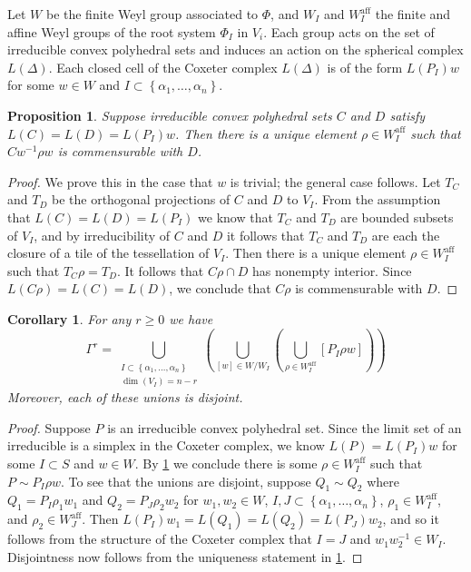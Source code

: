 \documentclass[11pt]{amsart}
\newtheorem{prop}[theorem]{Proposition}
\newtheorem{corollary}[theorem]{Corollary}
\numberwithin{table}{section}
\numberwithin{figure}{section}
\theoremstyle{remark}
\providecommand{\set}[1]{\left\lbrace#1\right\rbrace}
\newcommand{\Waff}[1][]{\ensuremath{W^{\mathrm{aff}}_{#1}}}
\begin{document}
Let $W$ be the finite Weyl group associated to $\Phi$, and $W_I$ and
$\Waff[I]$ the finite and affine Weyl groups of the root system
$\Phi_I$ in $V_i$. Each group acts on the set of irreducible convex
polyhedral sets and induces an action on the spherical complex
$L(\Delta)$. Each closed cell of the Coxeter complex $L(\Delta)$ is of
the form $L(P_I) w$ for some $w\in W$ and
$I\subset \set{\alpha_1,\dotsc, \alpha_n}$.

\begin{prop} \label{prop:irreds-with-same-limit}
  Suppose irreducible convex polyhedral sets $C$ and $D$ satisfy $L(C)
  = L(D) = L(P_I) w$. Then there is a unique element $\rho \in
  \Waff[I]$ such that $Cw^{-1}\rho w$ is commensurable with $D$.
\end{prop}
\begin{proof}
  We prove this in the case that $w$ is trivial; the general case
  follows. Let $T_C$ and $T_D$ be the orthogonal projections of $C$
  and $D$ to $V_I$. From the assumption that $L(C) = L(D) = L(P_I)$ we
  know that $T_C$ and $T_D$ are bounded subsets of $V_I$, and by
  irreducibility of $C$ and $D$ it follows that $T_C$ and $T_D$ are
  each the closure of a tile of the tessellation of $V_I$. Then there
  is a unique element $\rho \in \Waff[I]$ such that $T_C \rho =
  T_D$. It follows that $C \rho \cap D$ has nonempty interior. Since
  $L(C \rho) = L(C) = L(D)$, we conclude that $C \rho$ is
  commensurable with $D$.
\end{proof}
\begin{corollary} \label{cor:germclassification}
  For any $r\geq 0$ we have
  \[
    \Gamma^r = \bigcup_{\substack{I\subset \set{\alpha_1,\dotsc,
          \alpha_n}\\ \dim(V_I) = n-r}} \left(
      \bigcup_{[w]\in W/W_I} \left( \bigcup_{\rho \in \Waff[I]}
        [P_I \rho w] \right) \right)
  \]
  Moreover, each of these unions is disjoint.
\end{corollary}
\begin{proof}
  Suppose $P$ is an irreducible convex polyhedral set. Since the limit
  set of an irreducible is a simplex in the Coxeter complex, we know
  $L(P) = L(P_I) w$ for some $I\subset S$ and $w\in W$. By
  \cref{prop:irreds-with-same-limit} we conclude there is some
  $\rho \in \Waff[I]$ such that $P \sim P_I \rho w$.  To see that the
  unions are disjoint, suppose $Q_1\sim Q_2$ where
  $Q_1 = P_I \rho_1 w_1$ and $Q_2 = P_J \rho_2 w_2$ for
  $w_1, w_2 \in W$, $I,J\subset \set{\alpha_1,\dotsc, \alpha_n}$,
  $\rho_1 \in \Waff[I]$, and $\rho_2 \in \Waff[J]$. Then
  $L(P_I) w_1 = L(Q_1) = L(Q_2) = L(P_J) w_2$, and so it follows from
  the structure of the Coxeter complex that $I = J$ and
  $w_1 w_2^{-1} \in W_I$. Disjointness now follows from the uniqueness
  statement in \cref{prop:irreds-with-same-limit}.
\end{proof}
\end{document}
